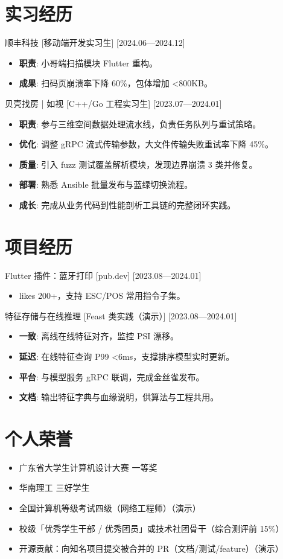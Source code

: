\documentclass{resume-photo}
\begin{document}
\section{实习经历}
\ResumeItem
{顺丰科技}
[\textnormal{移动端开发实习生}]
[2024.06—2024.12]

\begin{itemize}
  \item \textbf{职责}: 小哥端扫描模块 Flutter 重构。
  \item \textbf{成果}: 扫码页崩溃率下降 60\%，包体增加 <800KB。
\end{itemize}


\ResumeItem
{贝壳找房 | 如视}
[\textnormal{C++/Go 工程实习生}]
[2023.07—2024.01]

\begin{itemize}
  \item \textbf{职责}: 参与三维空间数据处理流水线，负责任务队列与重试策略。
  \item \textbf{优化}: 调整 gRPC 流式传输参数，大文件传输失败重试率下降 45\%。
  \item \textbf{质量}: 引入 fuzz 测试覆盖解析模块，发现边界崩溃 3 类并修复。
  \item \textbf{部署}: 熟悉 Ansible 批量发布与蓝绿切换流程。
  \item \textbf{成长}: 完成从业务代码到性能剖析工具链的完整闭环实践。
\end{itemize}



\section{项目经历}
\ResumeItem
{Flutter 插件：蓝牙打印}
[\textnormal{pub.dev}]
[2023.08—2024.01]

\begin{itemize}
  \item likes 200+，支持 ESC/POS 常用指令子集。
\end{itemize}


\ResumeItem
{特征存储与在线推理}
[\textnormal{Feast 类实践（演示）}]
[2023.08—2024.01]

\begin{itemize}
  \item \textbf{一致}: 离线在线特征对齐，监控 PSI 漂移。
  \item \textbf{延迟}: 在线特征查询 P99 <6ms，支撑排序模型实时更新。
  \item \textbf{平台}: 与模型服务 gRPC 联调，完成金丝雀发布。
  \item \textbf{文档}: 输出特征字典与血缘说明，供算法与工程共用。
\end{itemize}



\section{个人荣誉}
\begin{itemize}
  \item 广东省大学生计算机设计大赛 一等奖
  \item 华南理工 三好学生
  \item 全国计算机等级考试四级（网络工程师）（演示）
  \item 校级「优秀学生干部 / 优秀团员」或技术社团骨干（综合测评前 15\%）
  \item 开源贡献：向知名项目提交被合并的 PR（文档/测试/feature）（演示）
\end{itemize}
\end{document}
